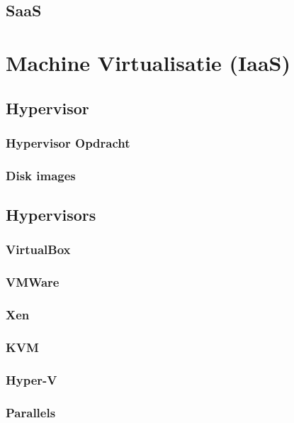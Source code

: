 \documentclass[a4paper,12pt,twoside,openright,titlepage]{book}
\begin{document}
\section{SaaS}


\chapter{Machine Virtualisatie (IaaS)}

\section{Hypervisor}

\subsection{Hypervisor Opdracht}

\subsection{Disk images}

\section{Hypervisors}

\subsection{VirtualBox}

\subsection{VMWare}

\subsection{Xen}

\subsection{KVM}

\subsection{Hyper-V}

\subsection{Parallels}

\end{document}
